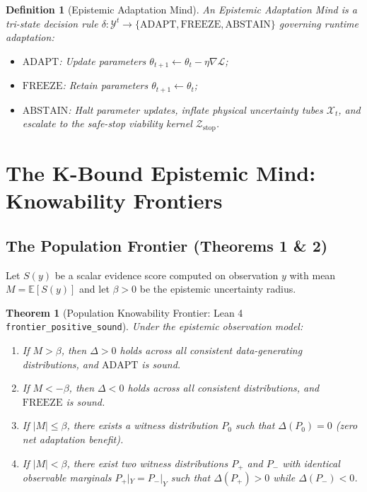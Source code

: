 \documentclass[10pt]{article}
\newtheorem{theorem}{Theorem}
\newtheorem{definition}{Definition}
\begin{document}
\begin{definition}[Epistemic Adaptation Mind]
An Epistemic Adaptation Mind is a tri-state decision rule $\delta : \mathcal{Y}^t \to \{\mathrm{ADAPT}, \mathrm{FREEZE}, \mathrm{ABSTAIN}\}$ governing runtime adaptation:
\begin{itemize}
    \item $\mathrm{ADAPT}$: Update parameters $\theta_{t+1} \leftarrow \theta_t - \eta \nabla \mathcal{L}$;
    \item $\mathrm{FREEZE}$: Retain parameters $\theta_{t+1} \leftarrow \theta_t$;
    \item $\mathrm{ABSTAIN}$: Halt parameter updates, inflate physical uncertainty tubes $\mathcal{X}_t$, and escalate to the safe-stop viability kernel $\mathcal{Z}_{\mathrm{stop}}$.
\end{itemize}
\end{definition}

\section{The K-Bound Epistemic Mind: Knowability Frontiers}

\subsection{The Population Frontier (Theorems 1 \& 2)}
Let $S(y)$ be a scalar evidence score computed on observation $y$ with mean $M = \mathbb{E}[S(y)]$ and let $\beta > 0$ be the epistemic uncertainty radius.

\begin{theorem}[Population Knowability Frontier: Lean 4 \texttt{frontier\_positive\_sound}]
\label{thm:frontier}
Under the epistemic observation model:
\begin{enumerate}
    \item If $M > \beta$, then $\Delta > 0$ holds across all consistent data-generating distributions, and $\mathrm{ADAPT}$ is sound.
    \item If $M < -\beta$, then $\Delta < 0$ holds across all consistent distributions, and $\mathrm{FREEZE}$ is sound.
    \item If $|M| \le \beta$, there exists a witness distribution $P_0$ such that $\Delta(P_0) = 0$ (zero net adaptation benefit).
    \item If $|M| < \beta$, there exist two witness distributions $P_+$ and $P_-$ with identical observable marginals $P_+|_Y = P_-|_Y$ such that $\Delta(P_+) > 0$ while $\Delta(P_-) < 0$.
\end{enumerate}
\end{theorem}
\end{document}
